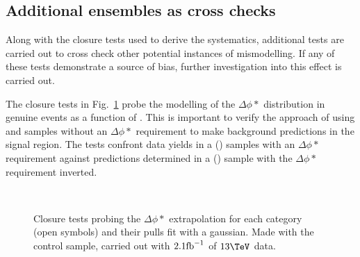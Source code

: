 \subsection{Additional ensembles as cross checks}
\label{sec:closureCrossCheck}

Along with the closure tests used to derive the systematics,
additional tests are carried out to cross check other potential
instances of mismodelling. If any of these tests demonstrate a source
of bias, further investigation into this effect is carried out. 

The closure tests in Fig.~\ref{fig:closureBDPhi} probe the modelling
of the $\Delta\phi *$ distribution in genuine \met events as a
function of \scalht. This is important to verify the approach of using
\mj and \mmj samples without an $\Delta\phi *$ requirement to make
background predictions in the signal region. The tests confront data
yields in a \mj (\mmj) samples with an $\Delta\phi *$ requirement
against predictions determined in a \mj (\mmj) sample with the
$\Delta\phi *$ requirement inverted. 

\begin{figure}[h!]
  \begin{center}
    ~~
    \caption{Closure tests probing the $\Delta\phi *$ extrapolation for each
    \njet category (open symbols) and their pulls fit with a gaussian.
    Made with the \mj control sample, carried out with $2.1\ifb$ of
      $13\tev$ data. }
    \label{fig:closureBDPhi}
  \end{center} 
\end{figure}

